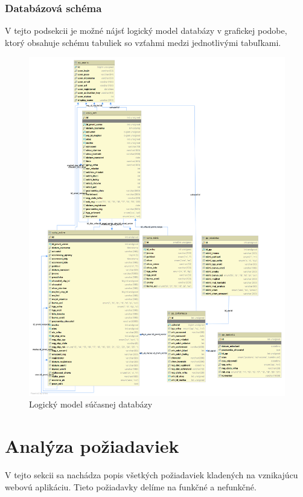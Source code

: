 \pagebreak 
\subsubsection{Databázová schéma}\label{schema-tabuliek}

V tejto podsekcii je možné nájsť logický model databázy v grafickej podobe, ktorý obsahuje schému tabuliek so vzťahmi medzi jednotlivými tabuľkami.

\begin{figure}[H]
	\includegraphics[width=1.0\textwidth]{media/analyza/diagram.png}
	\caption{Logický model súčasnej databázy}
\end{figure}

\section{Analýza požiadaviek}
V tejto sekcii sa nachádza popis všetkých požiadaviek kladených na vznikajúcu webovú aplikáciu.
Tieto požiadavky delíme na funkčné a nefunkčné.


